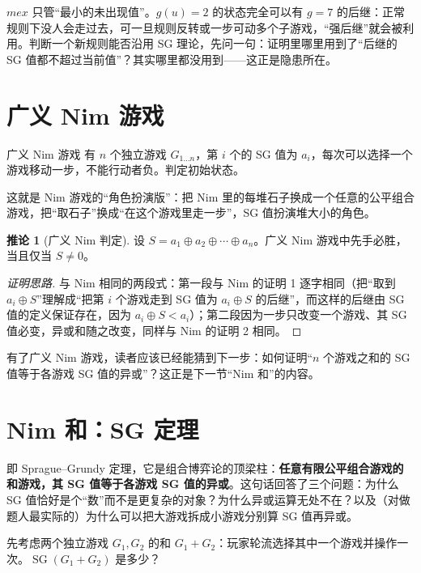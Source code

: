 \documentclass[UTF8,a4paper,11pt,oneside,openany,fontset=fandol]{ctexbook}
\theoremstyle{definition}
\newtheorem{corollary}[definition]{推论}
\newcommand{\SG}{\operatorname{SG}}
\begin{document}
\begin{pitfall}
$mex$ 只管“最小的未出现值”。$g(u)=2$ 的状态完全可以有 $g=7$ 的后继：正常规则下没人会走过去，可一旦规则反转或一步可动多个子游戏，“强后继”就会被利用。判断一个新规则能否沿用 SG 理论，先问一句：证明里哪里用到了“后继的 SG 值都不超过当前值”？其实哪里都没用到——这正是隐患所在。
\end{pitfall}

\section{广义 Nim 游戏}
\begin{problem}{广义 Nim 游戏}
有 $n$ 个独立游戏 $G_{1\ldots n}$，第 $i$ 个的 SG 值为 $a_i$，每次可以选择一个游戏移动一步，不能行动者负。判定初始状态。
\end{problem}

这就是 Nim 游戏的“角色扮演版”：把 Nim 里的每堆石子换成一个任意的公平组合游戏，把“取石子”换成“在这个游戏里走一步”，SG 值扮演堆大小的角色。

\begin{corollary}[广义 Nim 判定]
设 $S=a_1\oplus a_2\oplus\cdots\oplus a_n$。广义 Nim 游戏中先手必胜，当且仅当 $S\ne0$。
\end{corollary}
\begin{proof}[证明思路]
与 Nim 相同的两段式：第一段与 Nim 的证明 1 逐字相同（把“取到 $a_i\oplus S$”理解成“把第 $i$ 个游戏走到 SG 值为 $a_i\oplus S$ 的后继”，而这样的后继由 SG 值的定义保证存在，因为 $a_i\oplus S<a_i$）；第二段因为一步只改变一个游戏、其 SG 值必变，异或和随之改变，同样与 Nim 的证明 2 相同。
\end{proof}

有了广义 Nim 游戏，读者应该已经能猜到下一步：如何证明“$n$ 个游戏之和的 SG 值等于各游戏 SG 值的异或”？这正是下一节“Nim 和”的内容。

\section{Nim 和：SG 定理}
即 Sprague--Grundy 定理，它是组合博弈论的顶梁柱：\textbf{任意有限公平组合游戏的和游戏，其 SG 值等于各游戏 SG 值的异或}。这句话回答了三个问题：为什么 SG 值恰好是个“数”而不是更复杂的对象？为什么异或运算无处不在？以及（对做题人最实际的）为什么可以把大游戏拆成小游戏分别算 SG 值再异或。

先考虑两个独立游戏 $G_1,G_2$ 的和 $G_1+G_2$：玩家轮流选择其中一个游戏并操作一次。$\SG(G_1+G_2)$ 是多少？
\end{document}
